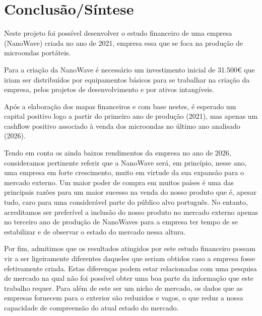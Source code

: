 \documentclass[a4paper]{article}
\begin{document}
\part{Conclusão/Síntese}
Neste projeto foi possível desenvolver o estudo financeiro de uma empresa (NanoWave) criada no ano de 2021, empresa essa que se foca na produção de microondas portáteis. \par
Para a criação da NanoWave é necessário um investimento inicial de 31.500€ que iriam ser distribuídos por equipamentos básicos para se trabalhar na criação da empresa, pelos projetos de desenvolvimento e por ativos intangíveis. \par
Após a elaboração dos mapas financeiros e com base nestes, é esperado um capital positivo logo a partir do primeiro ano de produção (2021), mas apenas um cashflow positivo associado à venda dos microondas no último ano analisado (2026). \par
Tendo em conta os ainda baixos rendimentos da empresa no ano de 2026, consideramos pertinente referir que a NanoWave será, em princípio, nesse ano, uma empresa em forte crescimento, muito em virtude da sua expansão para o mercado externo. Um maior poder de compra em muitos países é uma das principais razões para um maior sucesso na venda do nosso produto que é, apesar tudo, caro para uma considerável parte do público alvo português. No entanto, acreditamos ser preferível a inclusão do nosso produto no mercado externo apenas no terceiro ano de produção de NanoWaves para a empresa ter tempo de se estabilizar e de observar o estado do mercado nessa altura. \par
Por fim, admitimos que os resultados atingidos por este estudo financeiro possam vir a ser ligeiramente diferentes daqueles que seriam obtidos caso a empresa fosse efetivamente criada. Estas diferenças podem estar relacionadas com uma pesquisa de mercado na qual não foi possível obter uma boa parte da informação que este trabalho requer. Para além de este ser um nicho de mercado, os dados que as empresas fornecem para o exterior são reduzidos e vagos, o que reduz a nossa capacidade de compreensão do atual estado do mercado.


\end{document}
